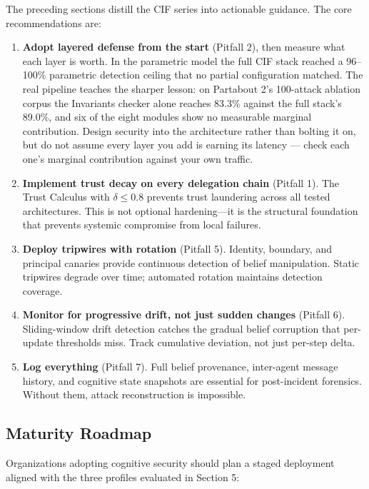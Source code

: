 \documentclass[
]{article}
\begin{document}
The preceding sections distill the CIF series into actionable guidance.
The core recommendations are:

\begin{enumerate}
\def\labelenumi{\arabic{enumi}.}
\item
  \textbf{Adopt layered defense from the start} (Pitfall 2), then
  measure what each layer is worth. In the parametric model the full CIF
  stack reached a 96--100\% parametric detection ceiling that no partial
  configuration matched. The real pipeline teaches the sharper lesson:
  on Partabout 2's 100-attack ablation corpus the Invariants
  checker alone reaches 83.3\% against the full stack's 89.0\%, and six
  of the eight modules show no measurable marginal contribution. Design
  security into the architecture rather than bolting it on, but do not
  assume every layer you add is earning its latency --- check each one's
  marginal contribution against your own traffic.
\item
  \textbf{Implement trust decay on every delegation chain} (Pitfall 1).
  The Trust Calculus with \(\delta \leq 0.8\) prevents trust laundering
  across all tested architectures. This is not optional hardening---it
  is the structural foundation that prevents systemic compromise from
  local failures.
\item
  \textbf{Deploy tripwires with rotation} (Pitfall 5). Identity,
  boundary, and principal canaries provide continuous detection of
  belief manipulation. Static tripwires degrade over time; automated
  rotation maintains detection coverage.
\item
  \textbf{Monitor for progressive drift, not just sudden changes}
  (Pitfall 6). Sliding-window drift detection catches the gradual belief
  corruption that per-update thresholds miss. Track cumulative
  deviation, not just per-step delta.
\item
  \textbf{Log everything} (Pitfall 7). Full belief provenance,
  inter-agent message history, and cognitive state snapshots are
  essential for post-incident forensics. Without them, attack
  reconstruction is impossible.
\end{enumerate}

\subsection{Maturity Roadmap}\label{maturity-roadmap}

Organizations adopting cognitive security should plan a staged
deployment aligned with the three profiles evaluated in Section 5:
\end{document}
